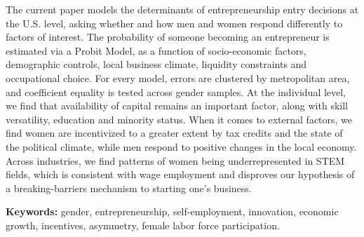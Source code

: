 \singlespacing 

The current paper models the determinants of entrepreneurship entry decisions at the U.S. level, asking whether and how men and women respond differently to factors of interest. The probability of someone becoming an entrepreneur is estimated via a Probit Model, as a function of socio-economic factors, demographic controls, local business climate, liquidity constraints and occupational choice. For every model, errors are clustered by metropolitan area, and coefficient equality is tested across gender samples. At the individual level, we find that availability of capital remains an important factor, along with skill versatility, education and minority status. When it comes to external factors, we find women are incentivized to a greater extent by tax credits and the state of the political climate, while men respond to positive changes in the local economy. Across industries, we find patterns of women being underrepresented in STEM fields, which is consistent with wage employment and disproves our hypothesis of a breaking-barriers mechanism to starting one's business. 

\singlespacing \textbf{Keywords:} gender, entrepreneurship, self-employment, innovation, economic growth, incentives, asymmetry, female labor force participation.

\bodyspacing